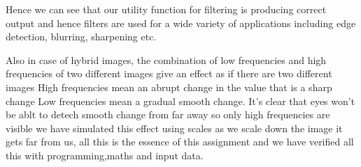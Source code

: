 \documentclass{bmvc2k}
\begin{document}
Hence we can see that our utility function for filtering is producing correct output
and hence filters are used for a wide variety of applications including edge detection, blurring, sharpening etc. 

Also in case of hybrid images, the combination of low frequencies and high frequencies of two different images
give an effect as if there are two different images 
High frequencies mean an abrupt change in the value that is a sharp change
Low frequencies mean a gradual smooth change. 
It's clear that eyes won't be ablt to detech smooth change from far away so only high frequencies are visible
we have simulated this effect using scales as we scale down the image it gets far from us,
all this is  the essence of this assignment and we have verified all this with programming,maths and input data. 






\end{document}
